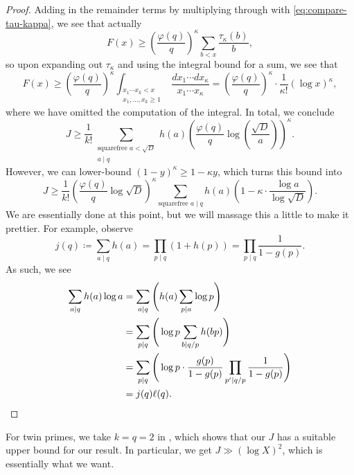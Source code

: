 \documentclass[../notes.tex]{subfiles}
\begin{document}
\begin{proof}
	Adding in the remainder terms by multiplying through with \eqref{eq:compare-tau-kappa}, we see that actually
	\[F(x)\ge\left(\frac{\varphi(q)}q\right)^{\kappa}\sum_{b<x}\frac{\tau_\kappa(b)}b,\]
	so upon expanding out $\tau_\kappa$ and using the integral bound for a sum, we see that
	\[F(x)\ge\left(\frac{\varphi(q)}q\right)^{\kappa}\int_{\substack{x_1\cdots x_k<x\\x_1,\ldots,x_k\ge1}}\frac{dx_1\cdots dx_\kappa}{x_1\cdots x_\kappa}=\left(\frac{\varphi(q)}q\right)^\kappa\cdot\frac1{\kappa!}(\log x)^\kappa,\]
	where we have omitted the computation of the integral. In total, we conclude
	\[J\ge\frac1{k!}\sum_{\substack{\text{squarefree }a<\sqrt D\\a\mid q}}h(a)\left(\frac{\varphi(q)}q\log\left(\frac{\sqrt D}a\right)\right)^\kappa.\]
	However, we can lower-bound $(1-y)^\kappa\ge1-\kappa y$, which turns this bound into
	\[J\ge\frac1{k!}\left(\frac{\varphi(q)}q\log\sqrt D\right)^\kappa\sum_{\text{squarefree }a\mid q}h(a)\left(1-\kappa\cdot\frac{\log a}{\log\sqrt D}\right).\]
	We are essentially done at this point, but we will massage this a little to make it prettier. For example, observe
	\[j(q)\coloneqq\sum_{a\mid q}h(a)=\prod_{p\mid q}(1+h(p))=\prod_{p\mid q}\frac1{1-g(p)}.\]
	As such, we see
	\begin{align*}
		\sum_{a\mid q}h(a)\log a &= \sum_{a\mid q}\Bigg(h(a)\sum_{p\mid a}\log p\Bigg) \\
		&= \sum_{p\mid q}\Bigg(\log p\sum_{b\mid q/p}h(bp)\Bigg) \\
		&= \sum_{p\mid q}\Bigg(\log p\cdot\frac{g(p)}{1-g(p)}\prod_{p'\mid q/p}\frac1{1-g(p)}\Bigg) \\
		&= j(q)\ell(q).
		\qedhere
	\end{align*}
\end{proof}
\begin{remark}
	For twin primes, we take $k=q=2$ in , which shows that our $J$ has a suitable upper bound for our result. In particular, we get $J\gg(\log X)^2$, which is essentially what we want.
\end{remark}
\end{document}
